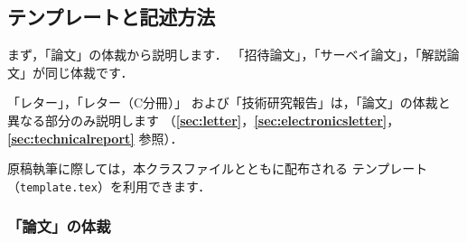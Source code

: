 \documentclass[paper]{ieicej}%
\begin{document}
\subsection{テンプレートと記述方法}

まず，「論文」の体裁から説明します．
「招待論文」，「サーベイ論文」，「解説論文」が同じ体裁です．

「レター」，「レター（C分冊）」
および「技術研究報告」は，「論文」の体裁と異なる部分のみ説明します
（{\bfseries \ref{sec:letter}}，{\bfseries \ref{sec:electronicsletter}}，
{\bfseries \ref{sec:technicalreport}} 参照）．

原稿執筆に際しては，本クラスファイルとともに配布される
テンプレート（\texttt{template.tex}）を利用できます．

\subsubsection{「論文」の体裁}
\label{sec:paper}
\end{document}

